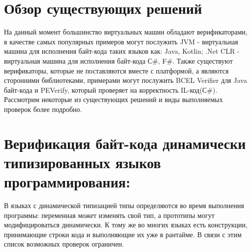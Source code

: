 \section{Обзор существующих решений}
\label{sec:Chapter2} 

На данный момент большинство виртуальных машин обладают верификаторами, в качестве самых популярных 
примеров могут послужить JVM - виртуальная машина для исполнения байт-кода таких языков как: Java, Kotlin;
.Net CLR - виртуальная машина для исполнения байт-кода С\#, F\#. Также существуют верификаторы, которые
не поставляются вместе с платформой, а являются сторонними библиотеками, примерами могут послужить 
BCEL Verifier для Java байт-кода и PEVerify, который проверяет на корректность IL-код(С\#). 
Рассмотрим некоторые из существующих решений и виды выполняемых проверок более подробно.

\section{Верификация байт-кода динамически типизированных языков программирования:}
В языках с динамической типизацией типы определяются во время выполнения программы: переменная может 
изменять свой тип, а прототипы могут модифицироваться динамически. К тому же во многих языках 
есть конструкции, принимающие строки 
кода и выполняющие их уже в рантайме. В связи с этим список возможных проверок ограничен.

